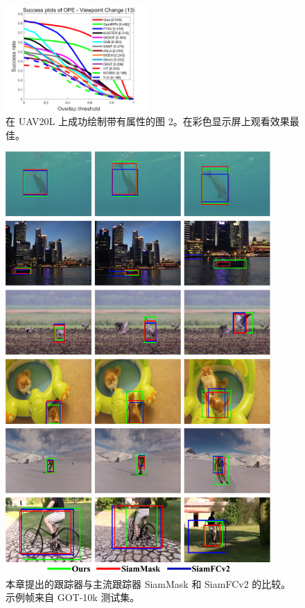 \begin{figure}[t!]
\begin{center}
	\includegraphics[width=0.48\textwidth]{Img/globally/UAV20L/VC_overlap_OPE_AUC.png}
\end{center}
   \caption{在 UAV20L 上成功绘制带有属性的图 2。在彩色显示屏上观看效果最佳。}
\label{fig:globally_uav20l_2}
\end{figure}

\nopagebreak[3]
\begin{figure}[p!]
    \centering
    \includegraphics[width=0.9\textwidth]{Img/globally/visulization.pdf}
    \caption{本章提出的跟踪器与主流跟踪器 SiamMask \cite{Wang2018SiamMask} 和 SiamFCv2 \cite{SiamFC} 的比较。示例帧来自 GOT-10k \cite{GOT-10k} 测试集。}
    \label{fig:gloablly_vis}
\end{figure}
\nopagebreak[3]

